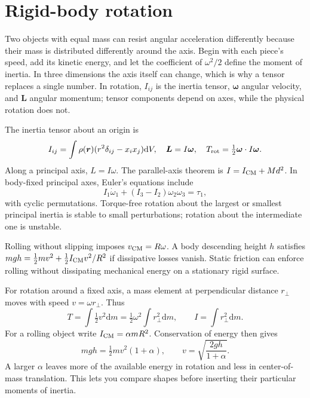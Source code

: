 \documentclass[11pt,oneside]{book}
\newcommand{\dd}{\mathrm{d}}
\newcommand{\vect}[1]{\boldsymbol{#1}}
\theoremstyle{reviewstyle}
\begin{document}
\section{Rigid-body rotation}
Two objects with equal mass can resist angular acceleration differently because their mass is distributed differently around the axis. Begin with each piece's speed, add its kinetic energy, and let the coefficient of $\omega^2/2$ define the moment of inertia. In three dimensions the axis itself can change, which is why a tensor replaces a single number. In rotation, $I_{ij}$ is the inertia tensor, $\vect\omega$ angular velocity, and $\vect L$ angular momentum; tensor components depend on axes, while the physical rotation does not.

The inertia tensor about an origin is
\begin{equation}
I_{ij}=\int\rho(\vect r)(r^2\delta_{ij}-x_ix_j)\dd V,
\quad \vect L=I\vect\omega,\quad T_{\rm rot}=\tfrac12\vect\omega\cdot I\vect\omega.
\end{equation}
Along a principal axis, $L=I\omega$. The parallel-axis theorem is $I=I_{\rm CM}+Md^2$. In body-fixed principal axes, Euler's equations include
\begin{equation}
I_1\dot\omega_1+(I_3-I_2)\omega_2\omega_3=\tau_1,
\end{equation}
with cyclic permutations. Torque-free rotation about the largest or smallest principal inertia is stable to small perturbations; rotation about the intermediate one is unstable.

Rolling without slipping imposes $v_{\rm CM}=R\omega$. A body descending height $h$ satisfies
$mgh=\tfrac12mv^2+\tfrac12I_{\rm CM}v^2/R^2$ if dissipative losses vanish. Static friction can enforce rolling without dissipating mechanical energy on a stationary rigid surface.

For rotation around a fixed axis, a mass element at perpendicular distance $r_\perp$ moves with speed $v=\omega r_\perp$. Thus
\begin{equation}
T=\int\tfrac12v^2\dd m=\tfrac12\omega^2\int r_\perp^2\dd m,
\qquad I=\int r_\perp^2\dd m.
\end{equation}
For a rolling object write $I_{\rm CM}=\alpha mR^2$. Conservation of energy then gives
\begin{equation}
mgh=\tfrac12mv^2(1+\alpha),\qquad
v=\sqrt{\frac{2gh}{1+\alpha}}.
\end{equation}
A larger $\alpha$ leaves more of the available energy in rotation and less in center-of-mass translation. This lets you compare shapes before inserting their particular moments of inertia.
\end{document}

